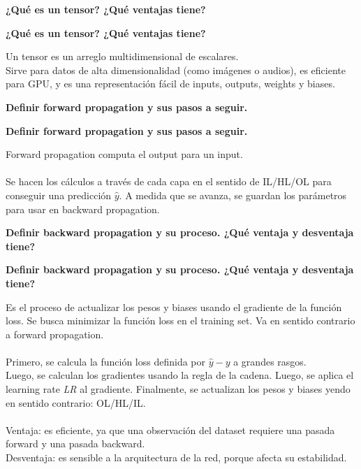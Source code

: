 \documentclass[10pt]{memoir}
\begin{document}
    \clearpage
    \begin{center}
        \textbf{\Large ¿Qué es un tensor? ¿Qué ventajas tiene?} \\
    \end{center}

    \clearpage
    \begin{center}
        \textbf{\Large ¿Qué es un tensor? ¿Qué ventajas tiene?} \\
    \end{center}
        Un tensor es un arreglo multidimensional de escalares. \\
        Sirve para datos de alta dimensionalidad (como imágenes o audios), es eficiente para GPU, y es una representación fácil de inputs, outputs, weights y biases.

    \clearpage
    \begin{center}
        \textbf{\Large Definir forward propagation y sus pasos a seguir.} \\
    \end{center}

    \clearpage
    \begin{center}
        \textbf{\Large Definir forward propagation y sus pasos a seguir.} \\
    \end{center}
        Forward propagation computa el output para un input. \\
        \\
        Se hacen los cálculos a través de cada capa en el sentido de IL/HL/OL para conseguir una predicción $\hat{y}$. A medida que se avanza, se guardan los parámetros para usar en backward propagation.

    \clearpage
    \begin{center}
        \textbf{\Large Definir backward propagation y su proceso. ¿Qué ventaja y desventaja tiene?} \\
    \end{center}

    \clearpage
    \begin{center}
        \textbf{\Large Definir backward propagation y su proceso. ¿Qué ventaja y desventaja tiene?} \\
    \end{center}
        Es el proceso de actualizar los pesos y biases usando el gradiente de la función loss. Se busca minimizar la función loss en el training set. Va en sentido contrario a forward propagation. \\
        \\
        Primero, se calcula la función loss definida por $\hat{y}-y$ a grandes rasgos. \\
        Luego, se calculan los gradientes usando la regla de la cadena. Luego, se aplica el learning rate \textit{LR} al gradiente.
        Finalmente, se actualizan los pesos y biases yendo en sentido contrario: OL/HL/IL. \\
        \\
        Ventaja: es eficiente, ya que una observación del dataset requiere una pasada forward y una pasada backward. \\
        Desventaja: es sensible a la arquitectura de la red, porque afecta su estabilidad.
\end{document}
